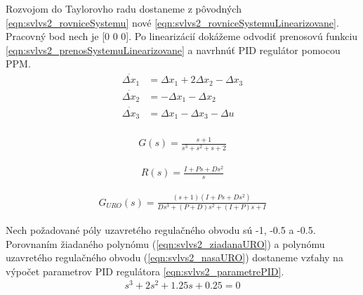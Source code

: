 \documentclass[../main.tex]{subfiles}
\begin{document}
Rozvojom do Taylorovho radu dostaneme z pôvodných \cref{eqn:svlvs2_rovniceSystemu} nové \cref{eqn:svlvs2_rovniceSystemuLinearizovane}. Pracovný bod nech je [0 0 0]. Po linearizácií dokážeme odvodiť prenosovú funkciu \cref{eqn:svlvs2_prenosSystemuLinearizovane} a navrhnúť PID regulátor pomocou PPM.
\begin{equation}
		\begin{aligned}
		\dot{\Delta x_1} &= \Delta x_1 + 2\Delta x_2 - \Delta x_3 			\\	
		\dot{\Delta x_2} &= - \Delta x_1 - \Delta x_2 					\\
		\dot{\Delta x_3} &=  \Delta x_1 - \Delta x_3 - \Delta u 				\\
		\end{aligned}
		\label{eqn:svlvs2_rovniceSystemuLinearizovane}
\end{equation}

\begin{equation}
		\begin{aligned}
		G(s) = \frac{s+1}{s^3+s^2+s+2}
		\end{aligned}
		\label{eqn:svlvs2_prenosSystemuLinearizovane}
\end{equation}

\begin{equation}
		\begin{aligned}
		R(s) = \frac{I + Ps + Ds^2}{s}
		\end{aligned}
		\label{eqn:svlvs2_prenosRegulatoraPID}
\end{equation}

\begin{equation}
		\begin{aligned}
		G_{URO}(s) = \frac{(s+1)(I + Ps + Ds^2)}{Ds^3+(P+D)s^2+(I+P)s+I}
		\end{aligned}
		\label{eqn:svlvs2_prenosUROSystemuLinearizovane}
\end{equation}

Nech požadované póly uzavretého regulačného obvodu sú -1, -0.5 a -0.5. Porovnaním žiadaného polynómu (\cref{eqn:svlvs2_ziadanaURO}) a polynómu uzavretého regulačného obvodu (\cref{eqn:svlvs2_nasaURO}) dostaneme vzťahy na výpočet parametrov PID regulátora \cref{eqn:svlvs2_parametrePID}.
\begin{equation}
		\begin{aligned}
		s^3+2s^2+1.25s+0.25=0
		\end{aligned}
		\label{eqn:svlvs2_ziadanaURO}
	\end{equation}
\end{document}
